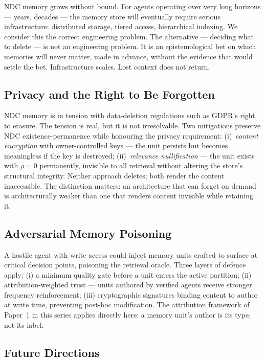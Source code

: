 \documentclass[12pt]{article}
\begin{document}
NDC memory grows without bound.  For agents operating over very long horizons —
years, decades — the memory store will eventually require serious infrastructure:
distributed storage, tiered access, hierarchical indexing.  We consider this the
correct engineering problem.  The alternative — deciding what to delete — is not
an engineering problem.  It is an epistemological bet on which memories will
never matter, made in advance, without the evidence that would settle the bet.
Infrastructure scales.  Lost context does not return.

\subsection{Privacy and the Right to Be Forgotten}

NDC memory is in tension with data-deletion regulations such as GDPR's right
to erasure.  The tension is real, but it is not irresolvable.  Two mitigations
preserve NDC existence-permanence while honouring the privacy requirement:
(i)~\emph{content encryption} with owner-controlled keys — the unit persists
but becomes meaningless if the key is destroyed; (ii)~\emph{relevance
nullification} — the unit exists with $\rho = 0$ permanently, invisible to all
retrieval without altering the store's structural integrity.  Neither approach
deletes; both render the content inaccessible.  The distinction matters: an
architecture that can forget on demand is architecturally weaker than one that
renders content invisible while retaining it.

\subsection{Adversarial Memory Poisoning}

A hostile agent with write access could inject memory units crafted to surface
at critical decision points, poisoning the retrieval oracle.  Three layers of
defence apply: (i) a minimum quality gate before a unit enters the active
partition; (ii) attribution-weighted trust — units authored by verified agents
receive stronger frequency reinforcement; (iii) cryptographic signatures
binding content to author at write time, preventing post-hoc modification.
The attribution framework of Paper~1 in this series applies directly here:
a memory unit's author is its type, not its label.

\subsection{Future Directions}
\end{document}
